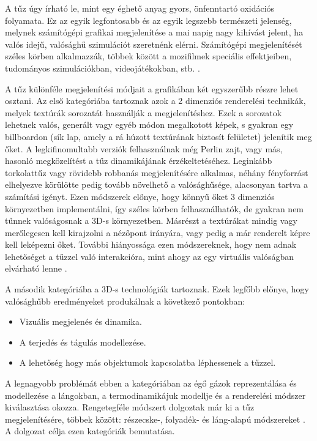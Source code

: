 
A tűz úgy írható le, mint egy éghető anyag gyors, önfenntartó oxidációs folyamata. Ez az egyik legfontosabb és az egyik legszebb természeti jelenség, melynek számítógépi grafikai megjelenítése a mai napig nagy kihívást jelent, ha valós idejű, valósághű szimulációt szeretnénk elérni. Számítógépi megjelenítését széles körben alkalmazzák, többek között a mozifilmek speciális effektjeiben, tudományos szimulációkban, videojátékokban, stb. \cite{steinemannFire}.

A tűz különféle megjelenítési módjait a grafikában két egyszerűbb részre lehet osztani. Az első kategóriába tartoznak azok a 2 dimenziós renderelési technikák, melyek textúrák sorozatát használják a megjelenítéshez. Ezek a sorozatok lehetnek valós, generált vagy egyéb módon megalkotott képek, s gyakran egy billboardon (sík lap, amely a rá húzott textúrának biztosít felületet) jelenítik meg őket. A legkifinomultabb verziók felhasználnak még Perlin zajt, vagy más, hasonló megközelítést a tűz dinamikájának érzékeltetéséhez. Leginkább torkolattűz vagy rövidebb robbanás megjelenítésére alkalmas, néhány fényforrást elhelyezve körülötte pedig tovább növelhető a valósághűsége, alacsonyan tartva a számítási igényt. Ezen módszerek előnye, hogy könnyű őket 3 dimenziós környezetben implementálni, így széles körben felhasználhatók, de gyakran nem tűnnek valóságosnak a 3D-s környezetben. Másrészt a textúrákat mindig vagy merőlegesen kell kirajzolni a nézőpont irányára, vagy pedig a már renderelt képre kell leképezni őket. További hiányossága ezen módszereknek, hogy nem adnak lehetőséget a tűzzel való interakcióra, mint ahogy az egy virtuális valóságban elvárható lenne \cite{steinemannFire}.

A második kategóriába a 3D-s technológiák tartoznak. Ezek legfőbb előnye, hogy valósághűbb eredményeket produkálnak a következő pontokban:
\begin{itemize}
\item Vizuális megjelenés és dinamika.
\item A terjedés és tágulás modellezése.
\item A lehetőség hogy más objektumok kapcsolatba léphessenek a tűzzel.
\end{itemize}
A legnagyobb problémát ebben a kategóriában az égő gázok reprezentálása és modellezése a lángokban, a termodinamikájuk modellje és a renderelési módszer kiválasztása okozza.
Rengetegféle módszert dolgoztak már ki a tűz megjelenítésére, többek között: részecske-, folyadék- és láng-alapú módszereket \cite{steinemannFire}. A dolgozat célja ezen kategóriák bemutatása.
